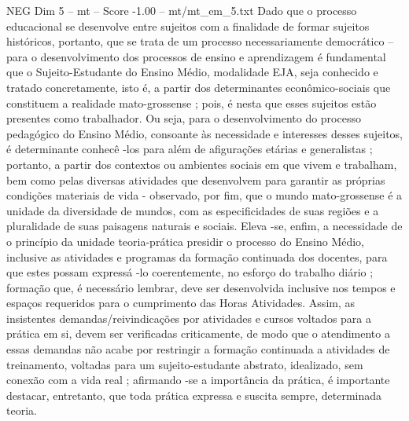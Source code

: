 \begin{textsample}{NEG Dim 5 – mt – Score -1.00 – mt/mt\_em\_5.txt}
Dado que o processo educacional se desenvolve entre sujeitos com a finalidade de formar sujeitos históricos, portanto, que se trata de um processo necessariamente democrático – para o desenvolvimento dos processos de ensino e aprendizagem é fundamental que o Sujeito-Estudante do Ensino Médio, modalidade EJA, seja conhecido e tratado concretamente, isto é, a partir dos determinantes econômico-sociais que constituem a realidade mato-grossense ; pois, é nesta que esses sujeitos estão presentes como trabalhador.
Ou seja, para o desenvolvimento do processo pedagógico do Ensino Médio, consoante às necessidade e interesses desses sujeitos, é determinante conhecê -los para além de afigurações etárias e generalistas ; portanto, a partir dos contextos ou ambientes sociais em que vivem e trabalham, bem como pelas diversas atividades que desenvolvem para garantir as próprias condições materiais de vida - observado, por fim, que o mundo mato-grossense é a unidade da diversidade de mundos, com as especificidades de suas regiões e a pluralidade de suas paisagens naturais e sociais.
Eleva -se, enfim, a necessidade de o princípio da unidade teoria-prática presidir o processo do Ensino Médio, inclusive as atividades e programas da formação continuada dos docentes, para que estes possam expressá -lo coerentemente, no esforço do trabalho diário ; formação que, é necessário lembrar, deve ser desenvolvida inclusive nos tempos e espaços requeridos para o cumprimento das Horas Atividades.
Assim, as insistentes demandas/reivindicações por atividades e cursos voltados para a prática em si, devem ser verificadas criticamente, de modo que o atendimento a essas demandas não acabe por restringir a formação continuada a atividades de treinamento, voltadas para um sujeito-estudante abstrato, idealizado, sem conexão com a vida real ; afirmando -se a importância da prática, é importante destacar, entretanto, que toda prática expressa e suscita sempre, determinada teoria.

\end{textsample}
